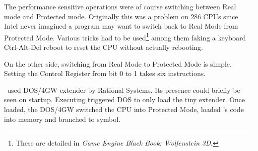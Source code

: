 The performance sensitive operations were of course switching between Real mode and Protected mode. Originally this was a problem on 286 CPUs since Intel never imagined a program may want to switch back to Real Mode from Protected Mode. Various tricks had to be used\footnote{These are detailed in \textit{Game Engine Black Book: Wolfenstein 3D}.} among them faking a keyboard Ctrl-Alt-Del reboot to reset the CPU without actually rebooting.\\
\par
On the other side, switching from Real Mode to Protected Mode is simple. Setting the Control Register from bit 0 to 1 takes six instructions.\\
\par
{}
\par

\doom~used DOS/4GW extender by Rational Systems. Its presence could briefly be seen on startup. Executing  triggered DOS to only load the tiny extender. Once loaded, the DOS/4GW switched the CPU into Protected Mode, loaded \doom's code into memory and branched to  symbol.\\
\par
{}





